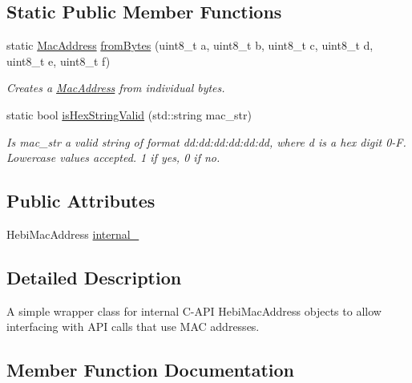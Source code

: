 \subsection*{Static Public Member Functions}
\begin{DoxyCompactItemize}
\item 
\mbox{\label{classhebi_1_1MacAddress_a478b629e48265e1a77afbc3feec03e35}} 
static \hyperlink{classhebi_1_1MacAddress}{Mac\+Address} \hyperlink{classhebi_1_1MacAddress_a478b629e48265e1a77afbc3feec03e35}{from\+Bytes} (uint8\+\_\+t a, uint8\+\_\+t b, uint8\+\_\+t c, uint8\+\_\+t d, uint8\+\_\+t e, uint8\+\_\+t f)
\begin{DoxyCompactList}\small\item\em Creates a \hyperlink{classhebi_1_1MacAddress}{Mac\+Address} from individual bytes. \end{DoxyCompactList}\item 
static bool \hyperlink{classhebi_1_1MacAddress_a3ac1c53a3f850f0228788d93482dcb57}{is\+Hex\+String\+Valid} (std\+::string mac\+\_\+str)
\begin{DoxyCompactList}\small\item\em Is mac\+\_\+str a valid string of format dd\+:dd\+:dd\+:dd\+:dd\+:dd, where \textquotesingle{}d\textquotesingle{} is a hex digit 0-\/F. Lowercase values accepted. 1 if yes, 0 if no. \end{DoxyCompactList}\end{DoxyCompactItemize}
\subsection*{Public Attributes}
\begin{DoxyCompactItemize}
\item 
Hebi\+Mac\+Address \hyperlink{classhebi_1_1MacAddress_ad199d2d2ce7c50825f8d75ade88dd4e7}{internal\+\_\+}
\end{DoxyCompactItemize}


\subsection{Detailed Description}
A simple wrapper class for internal C-\/\+A\+PI Hebi\+Mac\+Address objects to allow interfacing with A\+PI calls that use M\+AC addresses. 

\subsection{Member Function Documentation}
\mbox{\label{classhebi_1_1MacAddress_a3ac1c53a3f850f0228788d93482dcb57}} 
